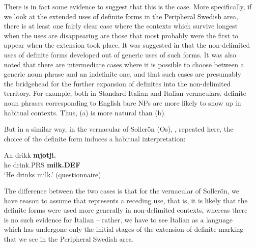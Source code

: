 There is in fact some evidence to suggest that this is the case. More specifically, if we look at the extended uses of definite forms in the Peripheral Swedish area, there is at least one fairly clear case where the contexts which survive longest when the uses are disappearing are those that most probably were the first to appear when the extension took place. It was suggested in  that the non-delimited uses of definite forms developed out of generic uses of such forms. It was also noted that there are intermediate cases where it is possible to choose between a generic noun phrase and an indefinite one, and that such cases are presumably the bridgehead for the further expansion of definites into the non-delimited territory. For example, both in Standard Italian and Italian vernaculars, definite noun phrases corresponding to English bare NPs are more likely to show up in habitual contexts. Thus, (a) is more natural than (b).

\ea\label{}

\z 
\z

But in a similar way, in the vernacular of Sollerön (Os), , repeated here, the choice of the definite form induces a habitual interpretation:

\ea\label{ex:54}
\gll An  drikk  \textbf{mjotji.}\\
he  drink.PRS  \textbf{milk.DEF}\\
\glt ‘He drinks milk.’ (questionnaire)
\z

The difference between the two cases is that for the vernacular of Sollerön, we have reason to assume that  represents a receding use, that is, it is likely that the definite forms were used more generally in non-delimited contexts, whereas there is no such evidence for Italian – rather, we have to see Italian as a language which has undergone only the initial stages of the extension of definite marking that we see in the Peripheral Swedish area. 

